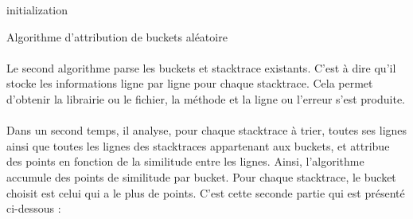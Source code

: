 \documentclass{article}
\begin{document}
\IncMargin{1em}
\begin{algorithm}[H]
\SetAlgoLined
\DontPrintSemicolon
{}
 initialization\;
\caption{Algorithme d'attribution de buckets aléatoire}
\end{algorithm}

\paragraph{}
Le second algorithme parse les buckets et stacktrace existants. C'est à dire qu'il stocke les informations ligne par ligne pour chaque stacktrace. Cela permet d'obtenir la librairie ou le fichier, la méthode et la ligne ou l'erreur s'est produite.

\paragraph{}
Dans un second temps, il analyse, pour chaque stacktrace à trier, toutes ses lignes ainsi que toutes les lignes des stacktraces appartenant aux buckets, et attribue des points en fonction de la similitude entre les lignes. Ainsi, l'algorithme accumule des points de similitude par bucket. Pour chaque stacktrace, le bucket choisit est celui qui a le plus de points.
C'est cette seconde partie qui est présenté ci-dessous :
~~\\
\end{document}
